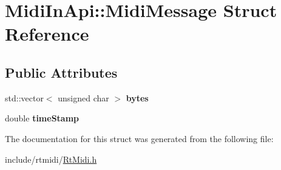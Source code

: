 \hypertarget{struct_midi_in_api_1_1_midi_message}{}\section{Midi\+In\+Api\+:\+:Midi\+Message Struct Reference}
\label{struct_midi_in_api_1_1_midi_message}
\subsection*{Public Attributes}
\begin{DoxyCompactItemize}
\item 
std\+::vector$<$ unsigned char $>$ {\bfseries bytes}\hypertarget{struct_midi_in_api_1_1_midi_message_a3072334eafb7be16be4ca237c942707a}{}\label{struct_midi_in_api_1_1_midi_message_a3072334eafb7be16be4ca237c942707a}

\item 
double {\bfseries time\+Stamp}\hypertarget{struct_midi_in_api_1_1_midi_message_a32dad612037ace7037af0d1779894c6e}{}\label{struct_midi_in_api_1_1_midi_message_a32dad612037ace7037af0d1779894c6e}

\end{DoxyCompactItemize}


The documentation for this struct was generated from the following file\+:\begin{DoxyCompactItemize}
\item 
include/rtmidi/\hyperlink{_rt_midi_8h}{Rt\+Midi.\+h}\end{DoxyCompactItemize}
